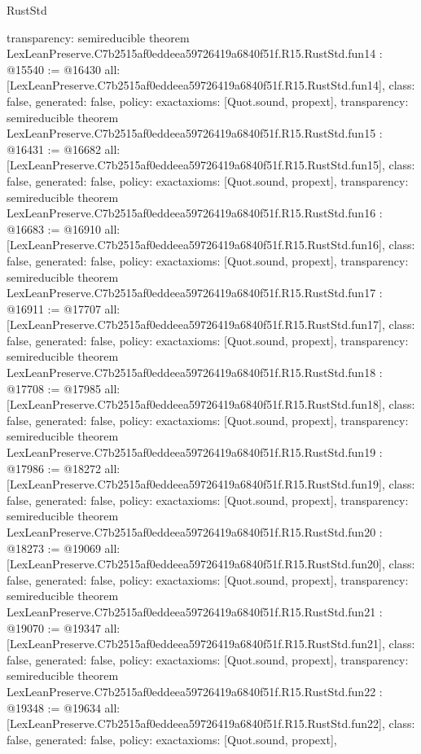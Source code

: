 \begin{lexlean}{RustStd}
\begin{coremodule}
{  transparency: semireducible
}
theorem LexLeanPreserve.C7b2515af0eddeea59726419a6840f51f.R15.RustStd.fun14 : @15540 := @16430 {
  all: [LexLeanPreserve.C7b2515af0eddeea59726419a6840f51f.R15.RustStd.fun14],
  class: false,
  generated: false,
  policy: exact{axioms: [Quot.sound, propext]},
  transparency: semireducible
}
theorem LexLeanPreserve.C7b2515af0eddeea59726419a6840f51f.R15.RustStd.fun15 : @16431 := @16682 {
  all: [LexLeanPreserve.C7b2515af0eddeea59726419a6840f51f.R15.RustStd.fun15],
  class: false,
  generated: false,
  policy: exact{axioms: [Quot.sound, propext]},
  transparency: semireducible
}
theorem LexLeanPreserve.C7b2515af0eddeea59726419a6840f51f.R15.RustStd.fun16 : @16683 := @16910 {
  all: [LexLeanPreserve.C7b2515af0eddeea59726419a6840f51f.R15.RustStd.fun16],
  class: false,
  generated: false,
  policy: exact{axioms: [Quot.sound, propext]},
  transparency: semireducible
}
theorem LexLeanPreserve.C7b2515af0eddeea59726419a6840f51f.R15.RustStd.fun17 : @16911 := @17707 {
  all: [LexLeanPreserve.C7b2515af0eddeea59726419a6840f51f.R15.RustStd.fun17],
  class: false,
  generated: false,
  policy: exact{axioms: [Quot.sound, propext]},
  transparency: semireducible
}
theorem LexLeanPreserve.C7b2515af0eddeea59726419a6840f51f.R15.RustStd.fun18 : @17708 := @17985 {
  all: [LexLeanPreserve.C7b2515af0eddeea59726419a6840f51f.R15.RustStd.fun18],
  class: false,
  generated: false,
  policy: exact{axioms: [Quot.sound, propext]},
  transparency: semireducible
}
theorem LexLeanPreserve.C7b2515af0eddeea59726419a6840f51f.R15.RustStd.fun19 : @17986 := @18272 {
  all: [LexLeanPreserve.C7b2515af0eddeea59726419a6840f51f.R15.RustStd.fun19],
  class: false,
  generated: false,
  policy: exact{axioms: [Quot.sound, propext]},
  transparency: semireducible
}
theorem LexLeanPreserve.C7b2515af0eddeea59726419a6840f51f.R15.RustStd.fun20 : @18273 := @19069 {
  all: [LexLeanPreserve.C7b2515af0eddeea59726419a6840f51f.R15.RustStd.fun20],
  class: false,
  generated: false,
  policy: exact{axioms: [Quot.sound, propext]},
  transparency: semireducible
}
theorem LexLeanPreserve.C7b2515af0eddeea59726419a6840f51f.R15.RustStd.fun21 : @19070 := @19347 {
  all: [LexLeanPreserve.C7b2515af0eddeea59726419a6840f51f.R15.RustStd.fun21],
  class: false,
  generated: false,
  policy: exact{axioms: [Quot.sound, propext]},
  transparency: semireducible
}
theorem LexLeanPreserve.C7b2515af0eddeea59726419a6840f51f.R15.RustStd.fun22 : @19348 := @19634 {
  all: [LexLeanPreserve.C7b2515af0eddeea59726419a6840f51f.R15.RustStd.fun22],
  class: false,
  generated: false,
  policy: exact{axioms: [Quot.sound, propext]},
}
\end{coremodule}
\end{lexlean}
